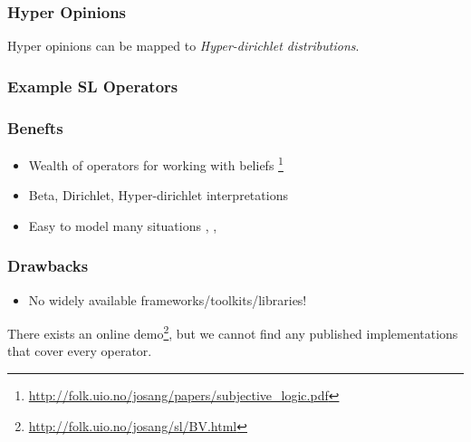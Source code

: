 \documentclass{beamer}
\begin{document}

\begin{frame}
\frametitle{Hyper Opinions}

Hyper opinions can be mapped to \emph{Hyper-dirichlet distributions}.

\end{frame}



\begin{frame}
\frametitle{Example SL Operators}


\end{frame}


\begin{frame}
\frametitle{Benefts}

\begin{itemize}
  \item Wealth of operators for working with beliefs
     \footnote{\url{http://folk.uio.no/josang/papers/subjective_logic.pdf}}
  \item Beta, Dirichlet, Hyper-dirichlet interpretations
  \item Easy to model many situations
    \cite{josang2008conditional}, \cite{josang2006trust}, \cite{kent2010application}
\end{itemize}

\end{frame}


\begin{frame}
\frametitle{Drawbacks}

\begin{itemize}
  \item No widely available frameworks/toolkits/libraries!
\end{itemize}

There exists an online demo\footnote{\url{http://folk.uio.no/josang/sl/BV.html}},
but we cannot find any published implementations that cover every operator.

\end{frame}
\end{document}
